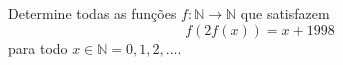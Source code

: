 Determine todas as funções $f : \mathbb{N} \to \mathbb{N}$ que satisfazem
$$f(2f(x)) = x + 1998$$
para todo $x \in \mathbb{N} = {0,1,2,...}$.